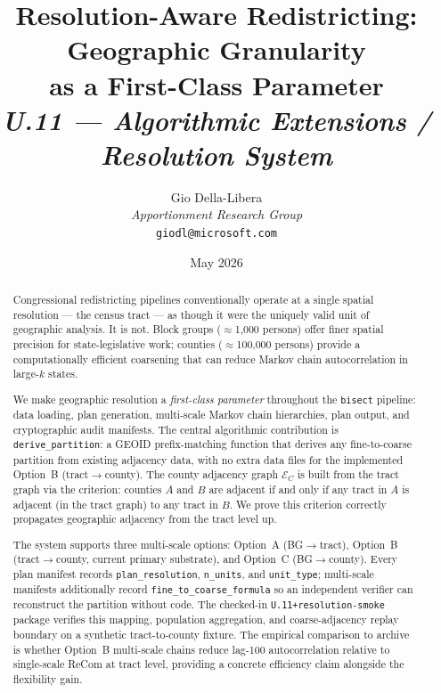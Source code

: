 \documentclass[12pt]{article}
\title{%
  \textbf{Resolution-Aware Redistricting: Geographic Granularity}\\
  \textbf{as a First-Class Parameter}\\[0.8em]
  \normalsize\textit{U.11 --- Algorithmic Extensions / Resolution System}%
}
\author{%
  Gio Della-Libera\\
  \textit{Apportionment Research Group}\\
  \small\texttt{giodl@microsoft.com}
}
\date{May 2026}
\newcommand{\redist}{\texttt{bisect}}
\newcommand{\derive}{\texttt{derive\_partition}}
\newcommand{\ec}{\ensuremath{\mathcal{E}_C}}   %
\begin{document}
\maketitle

\begin{abstract}
\noindent
Congressional redistricting pipelines conventionally operate at a single spatial
resolution --- the census tract --- as though it were the uniquely valid unit of
geographic analysis.
It is not.
Block groups ($\approx$1{,}000 persons) offer finer spatial precision for
state-legislative work; counties ($\approx$100{,}000 persons) provide a
computationally efficient coarsening that can reduce Markov chain autocorrelation
in large-$k$ states.

We make geographic resolution a \emph{first-class parameter} throughout the
\redist{} pipeline: data loading, plan generation, multi-scale Markov chain
hierarchies, plan output, and cryptographic audit manifests.
The central algorithmic contribution is \derive{}: a GEOID prefix-matching function
that derives any fine-to-coarse partition from existing adjacency data,
with no extra data files for the implemented Option~B (tract$\to$county).
The county adjacency graph $\ec$ is built from the tract graph via the
criterion: counties $A$ and $B$ are adjacent if and only if any tract in $A$
is adjacent (in the tract graph) to any tract in $B$.
We prove this criterion correctly propagates geographic adjacency from the
tract level up.

The system supports three multi-scale options:
Option~A (BG$\to$tract), Option~B (tract$\to$county, current primary
substrate), and Option~C (BG$\to$county).
Every plan manifest records \texttt{plan\_resolution}, \texttt{n\_units},
and \texttt{unit\_type}; multi-scale manifests additionally record
\texttt{fine\_to\_coarse\_formula} so an independent verifier can reconstruct
the partition without code.
The checked-in \texttt{U.11+resolution-smoke} package verifies this mapping,
population aggregation, and coarse-adjacency replay boundary on a synthetic
tract-to-county fixture.
The empirical comparison to archive is whether Option~B multi-scale chains
reduce lag-100 autocorrelation relative to single-scale ReCom at tract level,
providing a concrete efficiency claim alongside the flexibility gain.
\end{abstract}

\tableofcontents
\newpage












\end{document}
